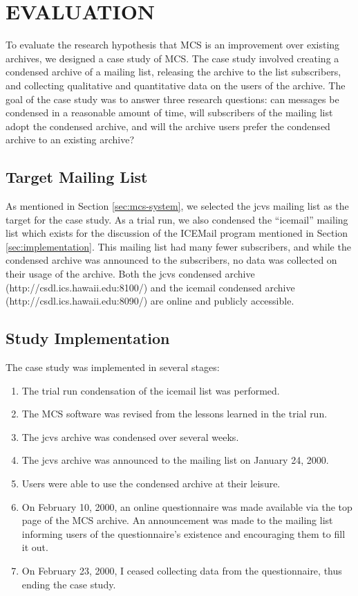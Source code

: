 \section{EVALUATION}
\label{sec:evaluation}
To evaluate the research hypothesis that MCS is an improvement over existing
archives, we designed a case study of MCS. The case study involved creating a
condensed archive of a mailing list, releasing the archive to the list
subscribers, and collecting qualitative and quantitative data on the users of
the archive. The goal of the case study was to answer three research questions:
can messages be condensed in a reasonable amount of time, will subscribers of
the mailing list adopt the condensed archive, and will the archive users prefer
the condensed archive to an existing archive?

\subsection{Target Mailing List}
As mentioned in Section \ref{sec:mcs-system}, we selected the jcvs mailing list
as the target for the case study. As a trial run, we also condensed the
``icemail'' mailing list which exists for the discussion of the ICEMail program
mentioned in Section \ref{sec:implementation}. This mailing list had many fewer
subscribers, and while the condensed archive was announced to the subscribers,
no data was collected on their usage of the archive. Both the jcvs condensed
archive (http://csdl.ics.hawaii.edu:8100/) and the icemail condensed archive
(http://csdl.ics.hawaii.edu:8090/) are online and publicly accessible.

\subsection{Study Implementation}
\label{sec:study-implementation}
The case study was implemented in several stages:

\begin{enumerate}
\item The trial run condensation of the icemail list was performed.
\item The MCS software was revised from the lessons learned in the trial run.
\item The jcvs archive was condensed over several weeks.
\item The jcvs archive was announced to the mailing list on January 24, 2000.
\item Users were able to use the condensed archive at their leisure.
\item On February 10, 2000, an online questionnaire was made available via the
  top page of the MCS archive. An announcement was made to the mailing list
  informing users of the questionnaire's existence and encouraging them to fill
  it out.
\item On February 23, 2000, I ceased collecting data from the questionnaire,
  thus ending the case study.
\end{enumerate}

